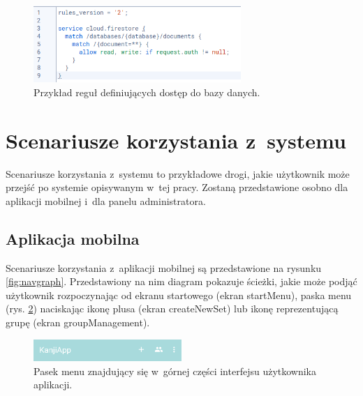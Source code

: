 \documentclass[a4paper,twoside,12pt]{book}
\begin{document}
\begin{figure}[]
\centering
\includegraphics[width=0.7\textwidth]{Firestore}
\caption{Przykład reguł definiujących dostęp do bazy danych.}
\label{fig:rules}
\end{figure}

\section{Scenariusze korzystania z~systemu}

Scenariusze korzystania z~systemu to przykładowe drogi, jakie użytkownik może przejść po systemie opisywanym w~tej pracy. Zostaną przedstawione osobno dla aplikacji mobilnej i~dla panelu administratora.

\subsection{Aplikacja mobilna}

Scenariusze korzystania z~aplikacji mobilnej są przedstawione na rysunku \ref{fig:navgraph}. Przedstawiony na nim diagram pokazuje ścieżki, jakie może podjąć użytkownik rozpoczynając od ekranu startowego (ekran startMenu), paska menu (rys. \ref{fig:menu}) naciskając ikonę plusa (ekran createNewSet) lub ikonę reprezentującą grupę (ekran groupManagement). 

\begin{figure}[]
\centering
\includegraphics[width=0.5\textwidth]{menu}
\caption{Pasek menu znajdujący się w~górnej części interfejsu użytkownika aplikacji.}
\label{fig:menu}
\end{figure}
\end{document}
